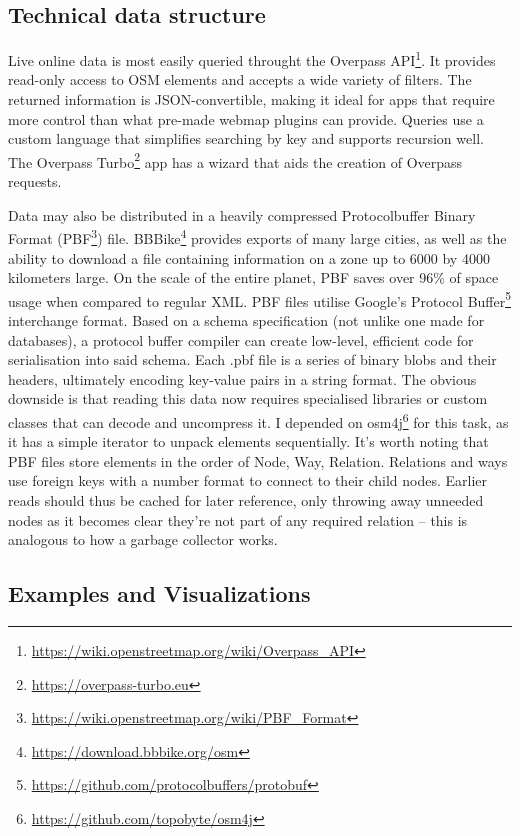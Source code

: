 \subsection{Technical data structure}

Live online data is most easily queried throught the Overpass API\footnote{\url{https://wiki.openstreetmap.org/wiki/Overpass_API}}. It provides read-only access to OSM elements and accepts a wide variety of filters. The returned information is JSON-convertible, making it ideal for apps that require more control than what pre-made webmap plugins can provide. Queries use a custom language that simplifies searching by key and supports recursion well. The Overpass Turbo\footnote{\url{https://overpass-turbo.eu}} app has a wizard that aids the creation of Overpass requests.

Data may also be distributed in a heavily compressed Protocolbuffer Binary Format (PBF\footnote{\url{https://wiki.openstreetmap.org/wiki/PBF_Format}}) file. BBBike\footnote{\url{https://download.bbbike.org/osm}} provides exports of many large cities, as well as the ability to download a file containing information on a zone up to 6000 by 4000 kilometers large. On the scale of the entire planet, PBF saves over 96\% of space usage when compared to regular XML. PBF files utilise Google's Protocol Buffer\footnote{\url{https://github.com/protocolbuffers/protobuf}} interchange format. Based on a schema specification (not unlike one made for databases), a protocol buffer compiler can create low-level, efficient code for serialisation into said schema. Each .pbf file is a series of binary blobs and their headers, ultimately encoding key-value pairs in a string format. The obvious downside is that reading this data now requires specialised libraries or custom classes that can decode and uncompress it. I depended on osm4j\footnote{\url{https://github.com/topobyte/osm4j}} for this task, as it has a simple iterator to unpack elements sequentially.
It's worth noting that PBF files store elements in the order of Node, Way, Relation. Relations and ways use foreign keys with a number format to connect to their child nodes. Earlier reads should thus be cached for later reference, only throwing away unneeded nodes as it becomes clear they're not part of any required relation -- this is analogous to how a garbage collector works.


\subsection{Examples and Visualizations}
